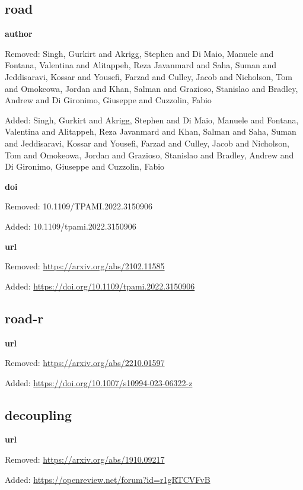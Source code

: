 \subsection*{road}
\noindent\textbf{author}\par
{\color{AuditRed}Removed: Singh, Gurkirt and Akrigg, Stephen and Di Maio, Manuele and Fontana, Valentina and Alitappeh, Reza Javanmard and Saha, Suman and Jeddisaravi, Kossar and Yousefi, Farzad and Culley, Jacob and Nicholson, Tom and Omokeowa, Jordan and Khan, Salman and Grazioso, Stanislao and Bradley, Andrew and Di Gironimo, Giuseppe and Cuzzolin, Fabio\par}
{\color{AuditGreen}Added: Singh, Gurkirt and Akrigg, Stephen and Di Maio, Manuele and Fontana, Valentina and Alitappeh, Reza Javanmard and Khan, Salman and Saha, Suman and Jeddisaravi, Kossar and Yousefi, Farzad and Culley, Jacob and Nicholson, Tom and Omokeowa, Jordan and Grazioso, Stanislao and Bradley, Andrew and Di Gironimo, Giuseppe and Cuzzolin, Fabio\par}
\noindent\textbf{doi}\par
{\color{AuditRed}Removed: 10.1109/TPAMI.2022.3150906\par}
{\color{AuditGreen}Added: 10.1109/tpami.2022.3150906\par}
\noindent\textbf{url}\par
{\color{AuditRed}Removed: \url{https://arxiv.org/abs/2102.11585}\par}
{\color{AuditGreen}Added: \url{https://doi.org/10.1109/tpami.2022.3150906}\par}
\medskip

\subsection*{road-r}
\noindent\textbf{url}\par
{\color{AuditRed}Removed: \url{https://arxiv.org/abs/2210.01597}\par}
{\color{AuditGreen}Added: \url{https://doi.org/10.1007/s10994-023-06322-z}\par}
\medskip

\subsection*{decoupling}
\noindent\textbf{url}\par
{\color{AuditRed}Removed: \url{https://arxiv.org/abs/1910.09217}\par}
{\color{AuditGreen}Added: \url{https://openreview.net/forum?id=r1gRTCVFvB}\par}
\medskip

